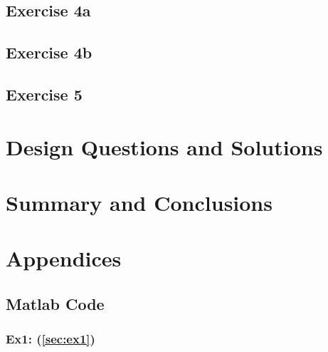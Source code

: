 \documentclass[12pt]{article}
\begin{document}
\subsection{Exercise 4a}\label{sec:ex4a}

\subsection{Exercise 4b}\label{sec:ex4b}

\subsection{Exercise 5}\label{sec:ex5}

\pagebreak

\section{Design Questions and Solutions}\label{sec:design}

\pagebreak

\section{Summary and Conclusions}\label{sec:summary}


\pagebreak





\pagebreak

\appendix
\section*{Appendices}\label{appendix:main}
\renewcommand{\thesubsection}{\Alph{subsection}}

\subsection{Matlab Code}
\subsubsection{Ex1: (\ref{sec:ex1})}\label{appendix:ex1}
\inputminted{matlab}{matlab/ex1.m}
\end{document}
